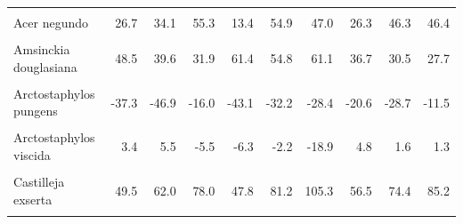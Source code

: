 \begin{longtable}[t]{lrrrrrrrrr}
\endfoot
\bottomrule
\endlastfoot
\cellcolor{gray!10}{Acer macrophyllum} & \cellcolor{gray!10}{-2.8} & \cellcolor{gray!10}{-17.4} & \cellcolor{gray!10}{-17.4} & \cellcolor{gray!10}{-8.8} & \cellcolor{gray!10}{-15.2} & \cellcolor{gray!10}{-36.1} & \cellcolor{gray!10}{-11.8} & \cellcolor{gray!10}{-28.2} & \cellcolor{gray!10}{-53.5}\\
Acer negundo & 26.7 & 34.1 & 55.3 & 13.4 & 54.9 & 47.0 & 26.3 & 46.3 & 46.4\\
\cellcolor{gray!10}{Achillea millefolium} & \cellcolor{gray!10}{-25.7} & \cellcolor{gray!10}{-34.8} & \cellcolor{gray!10}{-37.9} & \cellcolor{gray!10}{-26.6} & \cellcolor{gray!10}{-35.7} & \cellcolor{gray!10}{-46.9} & \cellcolor{gray!10}{-30.1} & \cellcolor{gray!10}{-42.7} & \cellcolor{gray!10}{-52.7}\\
Amsinckia douglasiana & 48.5 & 39.6 & 31.9 & 61.4 & 54.8 & 61.1 & 36.7 & 30.5 & 27.7\\
\cellcolor{gray!10}{Amsinckia menziesii} & \cellcolor{gray!10}{10.8} & \cellcolor{gray!10}{14.4} & \cellcolor{gray!10}{26.0} & \cellcolor{gray!10}{7.1} & \cellcolor{gray!10}{20.8} & \cellcolor{gray!10}{26.7} & \cellcolor{gray!10}{11.3} & \cellcolor{gray!10}{19.9} & \cellcolor{gray!10}{17.7}\\
\addlinespace
Arctostaphylos pungens & -37.3 & -46.9 & -16.0 & -43.1 & -32.2 & -28.4 & -20.6 & -28.7 & -11.5\\
\cellcolor{gray!10}{Arctostaphylos uva ursi} & \cellcolor{gray!10}{-61.5} & \cellcolor{gray!10}{-75.9} & \cellcolor{gray!10}{-83.2} & \cellcolor{gray!10}{-37.6} & \cellcolor{gray!10}{-73.1} & \cellcolor{gray!10}{-92.8} & \cellcolor{gray!10}{-51.7} & \cellcolor{gray!10}{-90.6} & \cellcolor{gray!10}{-97.2}\\
Arctostaphylos viscida & 3.4 & 5.5 & -5.5 & -6.3 & -2.2 & -18.9 & 4.8 & 1.6 & 1.3\\
\cellcolor{gray!10}{Astragalus lentiginosus} & \cellcolor{gray!10}{-0.5} & \cellcolor{gray!10}{-4.8} & \cellcolor{gray!10}{-15.0} & \cellcolor{gray!10}{6.0} & \cellcolor{gray!10}{-6.4} & \cellcolor{gray!10}{-13.5} & \cellcolor{gray!10}{7.5} & \cellcolor{gray!10}{-4.9} & \cellcolor{gray!10}{-27.2}\\
Castilleja exserta & 49.5 & 62.0 & 78.0 & 47.8 & 81.2 & 105.3 & 56.5 & 74.4 & 85.2\\
\addlinespace
\cellcolor{gray!10}{Ceanothus integerrimus} & \cellcolor{gray!10}{22.1} & \cellcolor{gray!10}{30.0} & \cellcolor{gray!10}{45.2} & \cellcolor{gray!10}{11.5} & \cellcolor{gray!10}{39.9} & \cellcolor{gray!10}{50.9} & \cellcolor{gray!10}{14.8} & \cellcolor{gray!10}{31.7} & \cellcolor{gray!10}{32.8}\\

\end{longtable}
